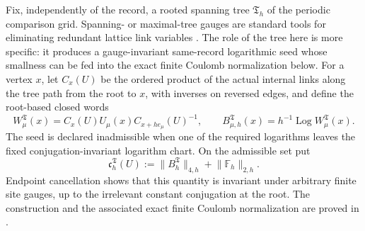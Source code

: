 \documentclass[11pt]{article}
\numberwithin{equation}{section}
\theoremstyle{definition}
\theoremstyle{remark}
\newcommand{\norm}[1]{\lVert#1\rVert}
\begin{document}
Fix, independently of the record, a rooted spanning tree $\mathfrak T_h$ of
the periodic comparison grid.  Spanning- or maximal-tree gauges are standard
tools for eliminating redundant lattice link variables
\cite{LigterinkWaletBishop2000}.  The role of the tree here is more specific:
it produces a gauge-invariant same-record logarithmic seed whose smallness can
be fed into the exact finite Coulomb normalization below.  For a vertex $x$,
let $C_x(U)$ be the ordered product of the actual internal links along the tree
path from the root to $x$, with inverses on reversed edges, and define the
root-based closed words
\begin{equation}
 W^{\mathfrak T}_\mu(x)
 =C_x(U)U_\mu(x)C_{x+h e_\mu}(U)^{-1},
 \qquad
 B^{\mathfrak T}_{\mu,h}(x)
 =h^{-1}\operatorname{Log}W^{\mathfrak T}_\mu(x).
 \label{eq:rooted-Wilson-seed}
\end{equation}
The seed is declared inadmissible when one of the required logarithms leaves
the fixed conjugation-invariant logarithm chart.  On the admissible set put
\begin{equation}
 \mathfrak c_h^{\mathfrak T}(U)
 :=\norm{B_h^{\mathfrak T}}_{4,h}+\norm{\mathbb F_h}_{2,h}.
 \label{eq:rooted-Wilson-certificate}
\end{equation}
Endpoint cancellation shows that this quantity is invariant under arbitrary
finite site gauges, up to the irrelevant constant conjugation at the root.
The construction and the associated exact finite Coulomb normalization are
proved in .
\end{document}
